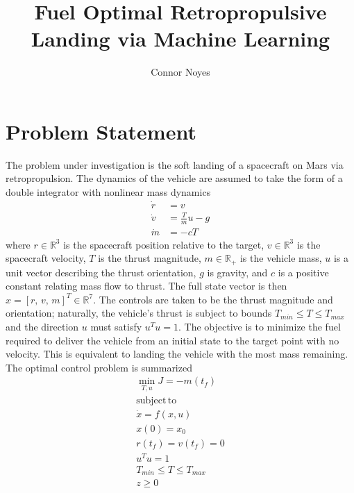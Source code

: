 \documentclass[10pt,a4paper]{article}
\author{Connor Noyes}
\title{Fuel Optimal Retropropulsive Landing via Machine Learning}
\begin{document}
	\maketitle
\section{Problem Statement}
The problem under investigation is the soft landing of a spacecraft on Mars via retropropulsion. The dynamics of the vehicle are assumed to take the form of a double integrator with nonlinear mass dynamics
\begin{align}
\dot{r} &= v \\
\dot{v} &= \frac{T}{m}u - g\\
\dot{m} &= -cT
\end{align}
where $r\in\mathbb{R}^3$ is the spacecraft position relative to the target, $v\in\mathbb{R}^3$ is the spacecraft velocity, $T$ is the thrust magnitude, $m\in\mathbb{R_+}$ is the vehicle mass, $u$ is a unit vector describing the thrust orientation, $g$ is gravity, and $c$ is a positive constant relating mass flow to thrust. The full state vector is then $x=[r,\,v,\,m]^T\in\mathbb{R}^7$. The controls are taken to be the thrust magnitude and orientation; naturally, the vehicle's thrust is subject to bounds $T_{min}\le T \le T_{max}$ and the direction $u$ must satisfy $u^Tu=1$. The objective is to minimize the fuel required to deliver the vehicle from an initial state to the target point with no velocity. This is equivalent to landing the vehicle with the most mass remaining. The optimal control problem is summarized
\begin{align}
\min_{T,u} J = -m(t_f) \\
\mathrm{subject\, to}\nonumber\\
\dot{x} = f(x,u) \\
x(0) = x_0 \\
r(t_f) = v(t_f) = 0 \\
u^Tu = 1 \\
T_{min}\le T \le T_{max} \\
z \ge 0 
\end{align}
\end{document}
